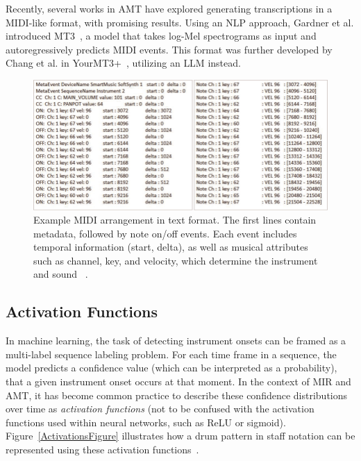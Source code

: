 Recently, several works in \gls{AMT} have explored generating transcriptions in a \gls{MIDI}-like format, with promising results. Using an \acrshort{NLP} approach, Gardner et al. introduced MT3~\cite{gardner2022mt3multitaskmultitrackmusic}, a model that takes log-Mel spectrograms as input and autoregressively predicts \gls{MIDI} events. This format was further developed by Chang et al. in YourMT3+~\cite{chang2024yourmt3+}, utilizing an \acrshort{LLM} instead.

\begin{figure}[H]
    \centering
    \includegraphics[scale=0.65, trim={0 0 13.8cm 0},clip]{figures/midi}
    \caption{Example MIDI arrangement in text format. The first lines contain metadata, followed by note on/off events. Each event includes temporal information (start, delta), as well as musical attributes such as channel, key, and velocity, which determine the instrument and sound ~\cite{starostenko2019}.}
    \label{MIDIFigure}
\end{figure}

\subsection{Activation Functions}

In machine learning, the task of detecting instrument onsets can be framed as a multi-label sequence labeling problem. For each time frame in a sequence, the model predicts a confidence value (which can be interpreted as a probability), that a given instrument onset occurs at that moment. In the context of \gls{MIR} and \gls{AMT}, it has become common practice to describe these confidence distributions over time as \textit{activation functions} (not to be confused with the activation functions used within neural networks, such as \acrshort{ReLU} or sigmoid). Figure~\ref{ActivationsFigure} illustrates how a drum pattern in staff notation can be represented using these activation functions~\cite{schluter2014improved, bock2016joint, Southall2016AutomaticDT, 8350302, vogl2018multiinstrumentdrumtranscription}.

